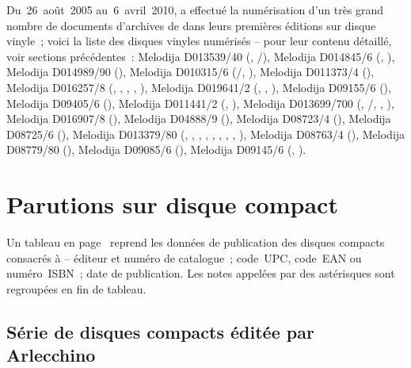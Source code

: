 Du~26~août~2005 au~6~avril~2010, \KMusatov{} \citep[voir][]{Musatov} a
effectué la numérisation d'un très grand nombre de documents d'archives de
\VSofronitsky{} dans leurs premières éditions sur disque vinyle~; voici la
liste des disques vinyles numérisés -- pour leur contenu détaillé, voir
sections précédentes~: Melodija D013539/40 (\Schubert{},
\Schubert{}/\Liszt{}), Melodija D014845/6 (\Mozart{}, \Schumann{}), Melodija
D014989/90 (\Scriabine{}), Melodija D010315/6 (\Schubert{}/\Liszt{},
\Liszt{}), Melodija D011373/4 (\Chopin{}), Melodija D016257/8 (\Debussy{},
\Liadov{}, \Blumenfeld{}, \Scriabine{}, \Prokofiev{}), Melodija D019641/2
(\Scriabine{}, \Chostakovitch{}, \Prokofiev{}), Melodija D09155/6
(\Scriabine{}), Melodija D09405/6 (\Rachmaninov{}), Melodija D011441/2
(\Liszt{}, \Schumann{}), Melodija D013699/700 (\Chopin{},
\Schubert{}/\Liszt{}, \Liszt{}, \Scriabine{}), Melodija D016907/8
(\Scriabine{}), Melodija D04888/9 (\Scriabine{}), Melodija D08723/4
(\Chopin{}), Melodija D08725/6 (\Schubert{}), Melodija D013379/80
(\Borodine{}, \Liadov{}, \Rachmaninov{}, \Scriabine{}, \Prokofiev{},
\Kabalevski{}, \Goltz{}, \Mendelssohn{}, \Debussy{}), Melodija D08763/4
(\Schumann{}), Melodija D08779/80 (\Scriabine{}), Melodija D09085/6
(\Chopin{}), Melodija D09145/6 (\Beethoven{}, \Mendelssohn{}).

\section{Parutions sur disque compact}

Un tableau en page~\pageref{tab:CDData} reprend les données de publication
des disques compacts consacrés à \VSofronitsky{} -- éditeur et numéro de
catalogue~; code~UPC, code~EAN ou numéro~ISBN~; date de publication.
Les notes appelées par des astérisques sont regroupées en fin de tableau.

\subsection{Série de disques compacts éditée par Arlecchino}

